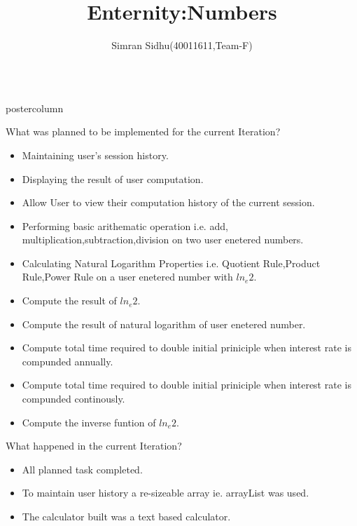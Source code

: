 \documentclass[final,hyperref={pdfpagelabels=false}]{beamer}
\title{\huge{Enternity:Numbers}}
\author{Simran Sidhu(40011611,Team-F)}
\institute[ui]{SOEN6481:Software Systems Requirements Specification\\
Function : Natural Logarithm of 2 i.e $ln_{e}2$
}
\newlength{\columnheight}
\begin{document}
\begin{frame}

 \begin{columns}
    \begin{column}{.49\textwidth}
      \begin{beamercolorbox}[center,wd=\textwidth]{postercolumn}
        \begin{minipage}[T]{.95\textwidth}  %
          \parbox[t][\columnheight]{\textwidth}{ %
            \begin{block}{What was planned to be implemented for the current Iteration?}
              \begin{itemize}
              \item Maintaining user's session history.
              \item Displaying the result of user computation.
              \item Allow User to view their computation history of the current session.
              \item Performing basic arithematic operation i.e. add, multiplication,subtraction,division on two user enetered numbers.
              \item Calculating Natural Logarithm Properties i.e. Quotient Rule,Product Rule,Power Rule on a user enetered number with $ln_{e}2$.
              \item Compute the result of $ln_{e}2$.
              \item Compute the result of natural logarithm of user enetered number.
              \item Compute total time required to double initial priniciple when interest rate is compunded annually.
              \item Compute total time required to double initial priniciple when interest rate is compunded continously.
              \item Compute the inverse funtion of $ln_{e}2$.
              \end{itemize}
            \end{block}
            \vfill
              \begin{block}{What happened in the current Iteration?}
              \begin{itemize}
              \item All planned task completed.
              \item To maintain user history a re-sizeable array ie. arrayList was used.
              \item The calculator built was a text based calculator.
              \end{itemize}              
            

\end{block}}
\end{minipage}
\end{beamercolorbox}
\end{column}
\end{columns}
\end{frame}
\end{document}
